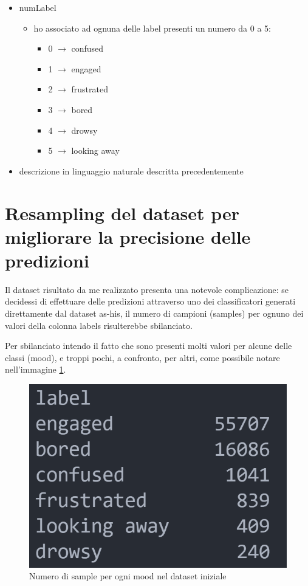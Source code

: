 \begin{itemize}
\begin{itemize}
\begin{itemize}
        \end{itemize}
        \item numLabel
        \begin{itemize}
            \item ho associato ad ognuna delle label presenti un numero da 0 a 5:
            \begin{itemize}
                \item 0 $\rightarrow$ confused
                \item 1 $\rightarrow$ engaged
                \item 2 $\rightarrow$ frustrated
                \item 3 $\rightarrow$ bored
                \item 4 $\rightarrow$ drowsy
                \item 5 $\rightarrow$ looking away
            \end{itemize}
        \end{itemize}
        \item descrizione in linguaggio naturale descritta precedentemente
    \end{itemize}
\end{itemize}

\section{Resampling del dataset per migliorare la precisione delle predizioni} 
Il dataset risultato da me realizzato presenta una notevole complicazione: se decidessi di effettuare delle predizioni attraverso uno dei classificatori generati direttamente dal dataset as-his, il numero di campioni (samples) per ognuno dei valori della colonna labels risulterebbe sbilanciato.

Per sbilanciato intendo il fatto che sono presenti molti valori per alcune delle classi (mood), e troppi pochi, a confronto, per altri, come possibile notare nell'immagine \ref{fig:image34}.
\begin{figure}
    \begin{center}    
        \includegraphics[width=0.2\linewidth]{images/image42.png}
        \caption{Numero di sample per ogni mood nel dataset iniziale}
        \label{fig:image34}
    \end{center}
\end{figure}


